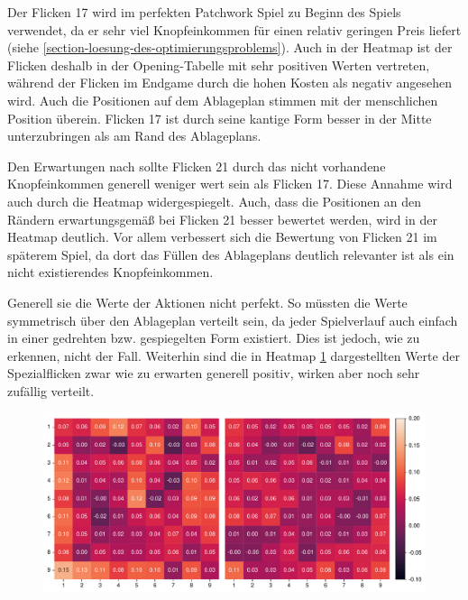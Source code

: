 \vspace*{-0.14cm}

Der Flicken 17 wird im perfekten Patchwork Spiel zu Beginn des Spiels verwendet, da er sehr viel Knopfeinkommen für einen relativ geringen Preis liefert (siehe \ref{section-loesung-des-optimierungsproblems}). Auch in der Heatmap ist der Flicken deshalb in der Opening-Tabelle mit sehr positiven Werten vertreten, während der Flicken im Endgame durch die hohen Kosten als negativ angesehen wird. Auch die Positionen auf dem Ablageplan stimmen mit der menschlichen Position überein. Flicken 17 ist durch seine kantige Form besser in der Mitte unterzubringen als am Rand des Ablageplans.

Den Erwartungen nach sollte Flicken 21 durch das nicht vorhandene Knopfeinkommen generell weniger wert sein als Flicken 17. Diese Annahme wird auch durch die Heatmap widergespiegelt. Auch, dass die Positionen an den Rändern erwartungsgemäß bei Flicken 21 besser bewertet werden, wird in der Heatmap deutlich. Vor allem verbessert sich die Bewertung von Flicken 21 im späterem Spiel, da dort das Füllen des Ablageplans deutlich relevanter ist als ein nicht existierendes Knopfeinkommen.

Generell sie die Werte der Aktionen nicht perfekt. So müssten die Werte symmetrisch über den Ablageplan verteilt sein, da jeder Spielverlauf auch einfach in einer gedrehten bzw. gespiegelten Form existiert. Dies ist jedoch, wie zu erkennen, nicht der Fall. Weiterhin sind die in Heatmap \ref{fig:action-ordering-special-patch} dargestellten Werte der Spezialflicken zwar wie zu erwarten generell positiv, wirken aber noch sehr zufällig verteilt.

\begin{figure}[!ht]
    \centering
    \begin{minipage}{.78\textwidth}
        \centering
        \includegraphics[width=\linewidth]{res/pictures/plots/special-action-ordering.pdf}
    \end{minipage}
    \label{fig:action-ordering-special-patch}
\end{figure}

